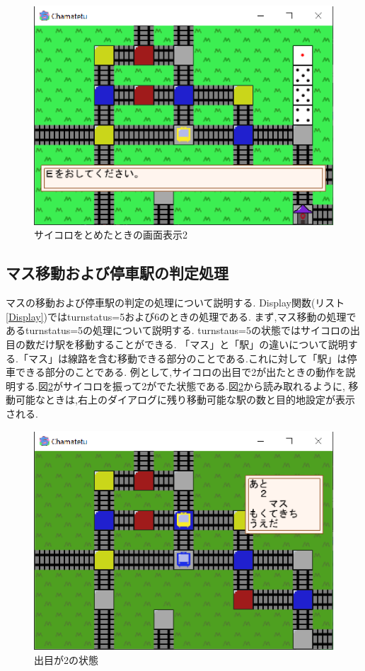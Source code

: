 \documentclass[a4j]{jarticle}
\begin{document}
        \begin{figure}[H]
            \centering
            \includegraphics[scale=1.3]{saikoro4r.eps}
            \caption{サイコロをとめたときの画面表示2}
             \label{dicestop4}
            \end{figure}   

    \subsection{マス移動および停車駅の判定処理}
    マスの移動および停車駅の判定の処理について説明する. Display関数(リスト\ref{Display})ではturnstatus=5および6のときの処理である.
    まず,マス移動の処理であるturnstatus=5の処理について説明する. turnstaus=5の状態ではサイコロの出目の数だけ駅を移動することができる.
    「マス」と「駅」の違いについて説明する.「マス」は線路を含む移動できる部分のことである.これに対して「駅」は停車できる部分のことである. 
    例として,サイコロの出目で2が出たときの動作を説明する.図\ref{kekka2}がサイコロを振って2がでた状態である.図\ref{kekka2}から読み取れるように,
    移動可能なときは,右上のダイアログに残り移動可能な駅の数と目的地設定が表示される.

    \begin{figure}[H]
        \centering
        \includegraphics[scale=1.3]{kekka2.eps}
        \caption{出目が2の状態}
         \label{kekka2}
        \end{figure} 
\end{document}
